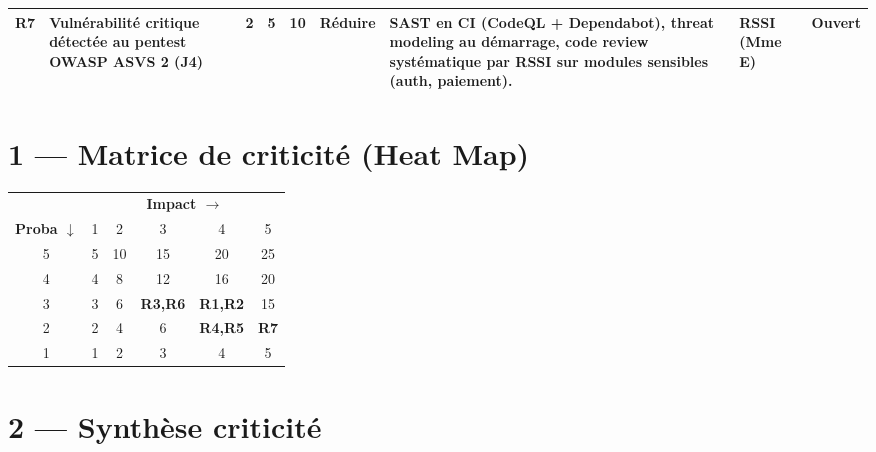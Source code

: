 \documentclass[11pt,a4paper,oneside]{report}
\begin{document}
\begin{landscape}
\begin{tabularx}{\linewidth}{C{0.5cm} L{3.5cm} C{0.7cm} C{0.7cm} C{0.8cm} L{2.8cm} L{4cm} C{2.2cm} C{1.6cm}}
R7 & Vulnérabilité critique détectée au pentest OWASP ASVS 2 (J4)
   & 2 & 5 & \textbf{10}
   & Réduire
   & SAST en CI (CodeQL + Dependabot), threat modeling au démarrage, code review systématique par RSSI sur modules sensibles (auth, paiement).
   & RSSI (Mme E) & Ouvert \\

\bottomrule
\end{tabularx}
\end{landscape}

\section*{1 --- Matrice de criticité (Heat Map)}

\begin{center}
\renewcommand{\arraystretch}{1.6}
\begin{tabular}{c|ccccc}
 & \multicolumn{5}{c}{\textbf{Impact $\rightarrow$}} \\
\textbf{Proba $\downarrow$} & 1 & 2 & 3 & 4 & 5 \\
\hline
5 & \cellcolor{cnOrange!40}5 & \cellcolor{cnOrange!40}10 & \cellcolor{cnRed!40}15 & \cellcolor{cnRed!40}20 & \cellcolor{cnRed!70}25 \\
4 & \cellcolor{cnGreen!30}4 & \cellcolor{cnOrange!40}8 & \cellcolor{cnOrange!40}12 & \cellcolor{cnRed!40}16 & \cellcolor{cnRed!40}20 \\
3 & \cellcolor{cnGreen!30}3 & \cellcolor{cnGreen!30}6 & \cellcolor{cnOrange!40}\textbf{R3,R6} & \cellcolor{cnOrange!40}\textbf{R1,R2} & \cellcolor{cnRed!40}15 \\
2 & \cellcolor{cnGreen!30}2 & \cellcolor{cnGreen!30}4 & \cellcolor{cnGreen!30}6 & \cellcolor{cnOrange!40}\textbf{R4,R5} & \cellcolor{cnOrange!40}\textbf{R7} \\
1 & \cellcolor{cnGreen!30}1 & \cellcolor{cnGreen!30}2 & \cellcolor{cnGreen!30}3 & \cellcolor{cnGreen!30}4 & \cellcolor{cnGreen!30}5 \\
\end{tabular}
\end{center}

\section*{2 --- Synthèse criticité}
\end{document}
